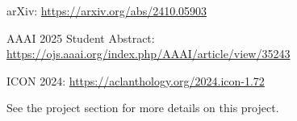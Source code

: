 \begin{resume_list}
  \item arXiv: \href{https://arxiv.org/abs/2410.05903}{https://arxiv.org/abs/2410.05903}
  \item AAAI 2025 Student Abstract: \href{https://ojs.aaai.org/index.php/AAAI/article/view/35243}{https://ojs.aaai.org/index.php/AAAI/article/view/35243}
  \item ICON 2024: \href{https://aclanthology.org/2024.icon-1.72/}{https://aclanthology.org/2024.icon-1.72}
  \item See the project section for more details on this project.
\end{resume_list}

